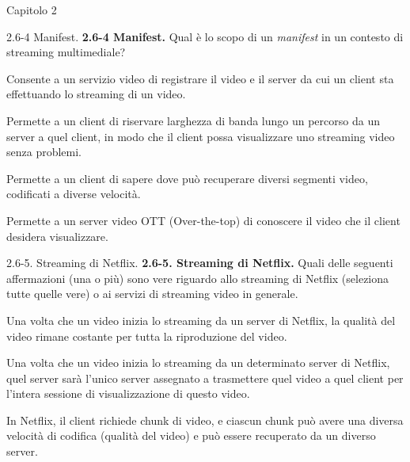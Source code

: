 \documentclass[11pt]{article}
\begin{document}
\begin{quiz}{Capitolo 2}
\begin{multi}[points=1,shuffle]{2.6-4 Manifest.}
\textbf{2.6-4 Manifest.}
Qual è lo scopo di un \emph{manifest} in un contesto di streaming multimediale?
\item Consente a un servizio video di registrare il video e il server da cui un client sta effettuando lo streaming di un video.
\item Permette a un client di riservare larghezza di banda lungo un percorso da un server a quel client, in modo che il client possa visualizzare uno streaming video senza problemi.
\item* Permette a un client di sapere dove può recuperare diversi segmenti video, codificati a diverse velocità.
\item Permette a un server video OTT (Over-the-top) di conoscere il video che il client desidera visualizzare.
\end{multi}

\begin{multi}[points=1,shuffle,multiple]{2.6-5. Streaming di Netflix.}
\textbf{2.6-5. Streaming di Netflix.}
Quali delle seguenti affermazioni (una o più) sono vere riguardo allo streaming di Netflix (seleziona tutte quelle vere) o ai servizi di streaming video in generale.
\item Una volta che un video inizia lo streaming da un server di Netflix, la qualità del video rimane costante per tutta la riproduzione del video.
\item Una volta che un video inizia lo streaming da un determinato server di Netflix, quel server sarà l'unico server assegnato a trasmettere quel video a quel client per l'intera sessione di visualizzazione di questo video.
\item* In Netflix, il client richiede chunk di video, e ciascun chunk può avere una diversa velocità di codifica (qualità del video) e può essere recuperato da un diverso server.
\end{multi}



\end{quiz}
\end{document}
